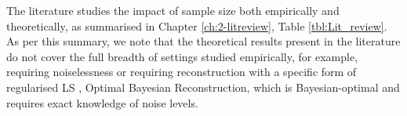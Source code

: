 The literature studies the impact of sample size both empirically and theoretically, as summarised in Chapter \ref{ch:2-litreview}, Table \ref{tbl:Lit_review}. As per this summary, we note that the theoretical results present in the literature do not cover the full breadth of settings studied empirically, for example, requiring noiselessness \cite{shomorony2014sampling} or requiring reconstruction with a specific form of regularised LS \cite{chamon2017greedy}, Optimal Bayesian Reconstruction, which is Bayesian-optimal and requires exact knowledge of noise levels. \cite{chamon2017greedy} 

